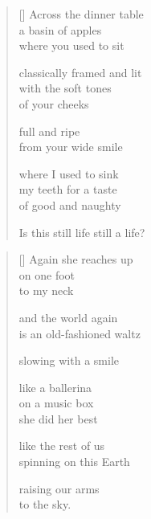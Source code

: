 \documentclass[14pt]{extbook}
\newcommand*{\centeredornament}{\centerline{\pgfornament[width=6cm]{88}}}
\begin{document}

\newpage

\vspace*{-15mm}
\centeredornament
\vspace*{-7mm}


\settowidth{\versewidth}{Is this still life still a life?}

\begin{verse}[\versewidth]
  Across the dinner table \\
  a basin of apples \\
  where you used to sit

  classically framed and lit \\
  with the soft tones \\
  of your cheeks

  full and ripe \\
  from your wide smile

  where I used to sink \\
  my teeth for a taste \\
  of good and naughty

  Is this still life still a life?
\end{verse}


\newpage

\vspace*{-15mm}
\centeredornament
\vspace*{-7mm}


\settowidth{\versewidth}{is an old-fashioned waltz}

\begin{verse}[\versewidth]
  Again she reaches up \\
  on one foot \\
  to my neck

  and the world again \\
  is an old-fashioned waltz

  slowing with a smile

  like a ballerina \\
  on a music box \\
  she did her best

  like the rest of us \\
  spinning on this Earth

  raising our arms \\
  to the sky.
\end{verse}
\end{document}
